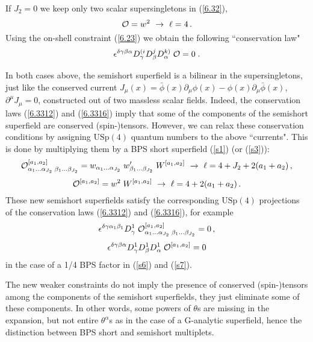 \documentclass[a4paper,11pt]{article}
\begin{document}
If $J_2=0$ we keep only two scalar supersingletons in (\ref{6.32}),
\begin{equation}\label{s5}
  {\cal O} = w^2 \ \rightarrow \ \ell = 4 \,.
\end{equation}
Using the on-shell constraint (\ref{6.23}) we obtain the following
``conservation law"
\begin{equation}\label{6.3316}
  \epsilon^{\delta\gamma\beta\alpha}D^{(i}_\gamma D^j_\beta
D^{k)}_\alpha\; {\cal O} = 0\;.
\end{equation}

In both cases above, the semishort superfield is a bilinear in the
supersingletons, just like the conserved current $J_\mu(x) = \bar\phi(x)
\partial_\mu\phi(x) - \phi(x) \partial_\mu \bar\phi(x)$, $\partial^\mu
J_\mu=0$, constructed out of two massless scalar fields. Indeed, the
conservation laws (\ref{6.3312}) and (\ref{6.3316}) imply that some of the
components of the semishort superfield are conserved (spin-)tensors. However,
we can relax these conservation conditions by assigning ${\mbox{USp}}(4)$
quantum numbers to the above ``currents". This is done by multiplying them by a
BPS short superfield (\ref{s1}) (or (\ref{s3})):
\begin{equation}\label{s6}
  {\cal O}^{[a_1,a_2]}_{\alpha_1\ldots\alpha_{J_2}\; \beta_1\ldots\beta_{J_2}} =
  w_{\alpha_1\ldots\alpha_{J_2}} \; w'_{\beta_1\ldots\beta_{J_2}}\; W^{[a_1,a_2]}
  \ \rightarrow \ \ell = 4 +J_2 + 2(a_1+a_2) \,,
\end{equation}
\begin{equation}\label{s7}
  {\cal O}^{[a_1,a_2]} = w^2\; W^{[a_1,a_2]} \ \rightarrow \ \ell = 4 + 2(a_1+a_2) \,.
\end{equation}
These new semishort superfields satisfy the corresponding ${\mbox{USp}}(4)$
projections of the conservation laws (\ref{6.3312}) and (\ref{6.3316}), for
example
\begin{equation}\label{s8}
  \epsilon^{\delta\gamma\alpha_1\beta_1} D^1_\gamma\;
  {\cal O}^{[a_1,a_2]}_{\alpha_1\ldots\alpha_{J_2}\;
  \beta_1\ldots\beta_{J_2}} =
  0\,,
\end{equation}
\begin{equation}\label{s9}
  \epsilon^{\delta\gamma\beta\alpha}D^{1}_\gamma D^1_\beta
D^{1}_\alpha\; {\cal O}^{[a_1,a_2]} = 0
\end{equation}
in the case of a 1/4 BPS factor in (\ref{s6}) and (\ref{s7}).

The new weaker constraints do not imply the presence of conserved
(spin-)tensors among the components of the semishort superfields,
they just eliminate some of these components. In other words, some
powers of $\theta$s are missing in the expansion, but not entire
$\theta^\alpha$s as in the case of a G-analytic superfield, hence
the distinction between BPS short and semishort multiplets.
\end{document}
